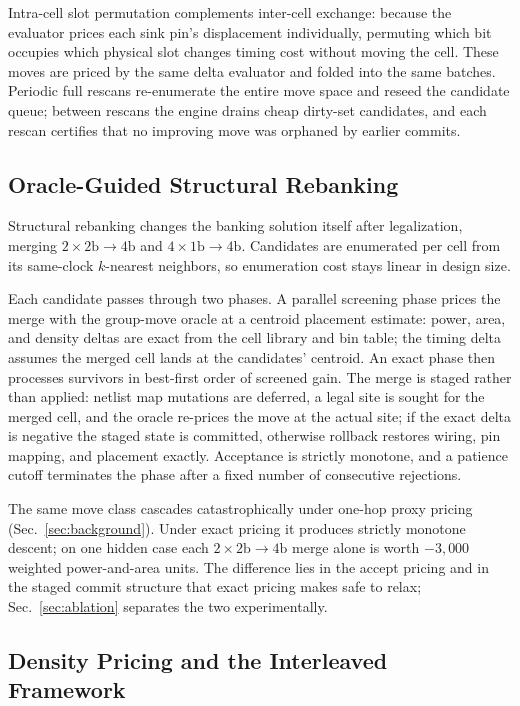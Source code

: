 Intra-cell slot permutation complements inter-cell exchange: because the evaluator prices each sink pin's displacement individually, permuting which bit occupies which physical slot changes timing cost without moving the cell. These moves are priced by the same delta evaluator and folded into the same batches. Periodic full rescans re-enumerate the entire move space and reseed the candidate queue; between rescans the engine drains cheap dirty-set candidates, and each rescan certifies that no improving move was orphaned by earlier commits.

\subsection{Oracle-Guided Structural Rebanking}\label{sec:rebank}

Structural rebanking changes the banking solution itself after legalization, merging $2{\times}2\mathrm{b}{\to}4\mathrm{b}$ and $4{\times}1\mathrm{b}{\to}4\mathrm{b}$. Candidates are enumerated per cell from its same-clock $k$-nearest neighbors, so enumeration cost stays linear in design size.

Each candidate passes through two phases. A parallel screening phase prices the merge with the group-move oracle at a centroid placement estimate: power, area, and density deltas are exact from the cell library and bin table; the timing delta assumes the merged cell lands at the candidates' centroid. An exact phase then processes survivors in best-first order of screened gain. The merge is staged rather than applied: netlist map mutations are deferred, a legal site is sought for the merged cell, and the oracle re-prices the move at the actual site; if the exact delta is negative the staged state is committed, otherwise rollback restores wiring, pin mapping, and placement exactly. Acceptance is strictly monotone, and a patience cutoff terminates the phase after a fixed number of consecutive rejections.

The same move class cascades catastrophically under one-hop proxy pricing (Sec.~\ref{sec:background}). Under exact pricing it produces strictly monotone descent; on one hidden case each $2{\times}2\mathrm{b}{\to}4\mathrm{b}$ merge alone is worth $-3{,}000$ weighted power-and-area units. The difference lies in the accept pricing and in the staged commit structure that exact pricing makes safe to relax; Sec.~\ref{sec:ablation} separates the two experimentally.

\subsection{Density Pricing and the Interleaved Framework}\label{sec:density}\label{sec:framework}


